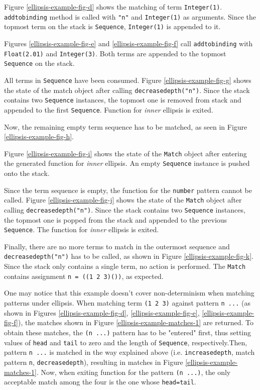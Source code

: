 Figure \ref{ellipsis-example-fig-d} shows the matching of term \texttt{Integer(1)}. \texttt{addtobinding} method is called with \texttt{"n"} and \texttt{Integer(1)} as arguments. Since the topmost term on the stack is \texttt{Sequence}, \texttt{Integer(1)} is appended to it.

Figures \ref{ellipsis-example-fig-e} and \ref{ellipsis-example-fig-f} call \texttt{addtobinding} with \texttt{Float(2.01)} and \texttt{Integer(3)}. Both terms are appended to the topmost \texttt{Sequence} on the stack.

All terms in \texttt{Sequence} have been consumed. Figure \ref{ellipsis-example-fig-g} shows the state of the match object after calling \texttt{decreasedepth("n")}. Since the stack contains two \texttt{Sequence} instances, the topmost one is removed from stack and appended to the first \texttt{Sequence}. Function for \textit{inner} ellipsis is exited.

Now, the remaining empty term sequence has to be matched, as seen in Figure \ref{ellipsis-example-fig-h}.

Figure \ref{ellipsis-example-fig-i} shows the state of the \texttt{Match} object after entering the generated function for \textit{inner} ellipsis. An empty \texttt{Sequence} instance is pushed onto the stack.

Since the term sequence is empty, the function for the \texttt{number} pattern cannot be called. Figure \ref{ellipsis-example-fig-j} shows the state of the \texttt{Match} object after calling \texttt{decreasedepth("n")}. Since the stack contains two \texttt{Sequence} instances, the topmost one is popped from the stack and appended to the previous \texttt{Sequence}. The function for \textit{inner} ellipsis is exited.

Finally, there are no more terms to match in the outermost sequence and \texttt{decreasedepth("n")} has to be called, as shown in Figure \ref{ellipsis-example-fig-k}. Since the stack only contains a single term, no action is performed. The \texttt{Match} contains assignment \texttt{n = ((1 2 3)())}, as expected.



One may notice that this example doesn't cover non-determinism when matching patterns under ellipsis. When matching term \texttt{(1 2 3)} against pattern \texttt{n ...} (as shown in Figures \ref{ellipsis-example-fig-d}, \ref{ellipsis-example-fig-e}, \ref{ellipsis-example-fig-f}), the matches shown in Figure \ref{ellipsis-example-matches-1} are returned. To obtain these matches, the \texttt{(n ...)} pattern has to be "entered" first, thus setting values of \texttt{head} and \texttt{tail} to zero and the length of \texttt{Sequence}, respectively.Then, pattern \texttt{n ...} is matched in the way explained above (i.e. \texttt{increasedepth}, match pattern \texttt{n}, \texttt{decreasedepth}), resulting in matches in Figure \ref{ellipsis-example-matches-1}.  Now, when exiting function for the pattern \texttt{(n ...)}, the only acceptable match among the four is the one whose \texttt{head=tail}.

